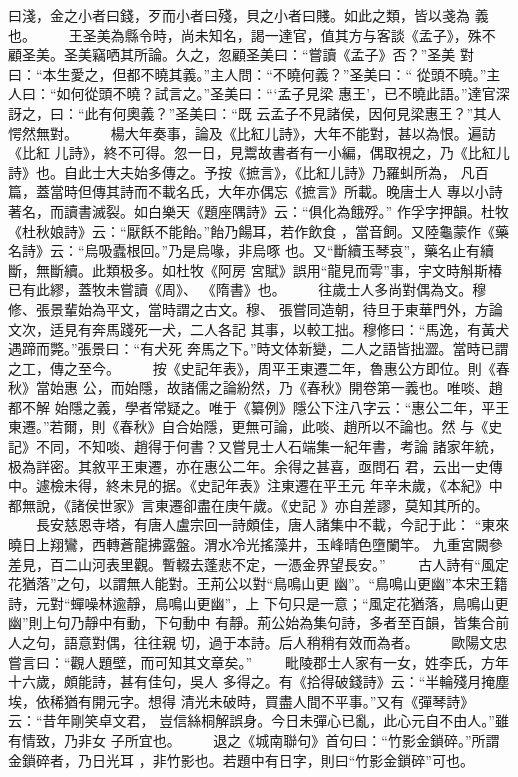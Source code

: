 \documentclass{ctexart}
\begin{document}
曰淺，金之小者曰錢，歹而小者曰殘，貝之小者曰賤。如此之類，皆以戔為 義也。 　　王圣美為縣令時，尚未知名，謁一達官，值其方与客談《孟子》，殊不 顧圣美。圣美竊哂其所論。久之，忽顧圣美曰：``嘗讀《孟子》否？''圣美 對曰：``本生愛之，但都不曉其義。''主人問：``不曉何義？''圣美曰：`` 從頭不曉。''主人曰：``如何從頭不曉？試言之。''圣美曰：```孟子見梁 惠王'，已不曉此語。''達官深訝之，曰：``此有何奧義？''圣美曰：``既 云孟子不見諸侯，因何見梁惠王？''其人愕然無對。 　　楊大年奏事，論及《比紅儿詩》，大年不能對，甚以為恨。遍訪《比紅 儿詩》，終不可得。忽一日，見鬻故書者有一小編，偶取視之，乃《比紅儿 詩》也。自此士大夫始多傳之。予按《摭言》，《比紅儿詩》乃羅虯所為， 凡百篇，蓋當時但傳其詩而不載名氏，大年亦偶忘《摭言》所載。晚唐士人 專以小詩著名，而讀書滅裂。如白樂天《題座隅詩》云：``俱化為餓殍。'' 作孚字押韻。杜牧《杜秋娘詩》云：``厭飫不能飴。''飴乃餳耳，若作飲食 ，當音飼。又陸龜蒙作《藥名詩》云：``烏吸蠹根回。''乃是烏喙，非烏啄 也。又``斷續玉琴哀''，藥名止有續斷，無斷續。此類极多。如杜牧《阿房 宮賦》誤用``龍見而雩''事，宇文時斛斯椿已有此繆，蓋牧未嘗讀《周》、 《隋書》也。 　　往歲士人多尚對偶為文。穆修、張景輩始為平文，當時謂之古文。穆、 張嘗同造朝，待旦于東華門外，方論文次，适見有奔馬踐死一犬，二人各記 其事，以較工拙。穆修曰：``馬逸，有黃犬遇蹄而斃。''張景曰：``有犬死 奔馬之下。''時文体新變，二人之語皆拙澀。當時已謂之工，傳之至今。 　　按《史記年表》，周平王東遷二年，魯惠公方即位。則《春秋》當始惠 公，而始隱，故諸儒之論紛然，乃《春秋》開卷第一義也。唯啖、趙都不解 始隱之義，學者常疑之。唯于《纂例》隱公下注八字云：``惠公二年，平王 東遷。''若爾，則《春秋》自合始隱，更無可論，此啖、趙所以不論也。然 与《史記》不同，不知啖、趙得于何書？又嘗見士人石端集一紀年書，考論 諸家年統，极為詳密。其敘平王東遷，亦在惠公二年。余得之甚喜，亟問石 君，云出一史傳中。遽檢未得，終未見的据。《史記年表》注東遷在平王元 年辛未歲，《本紀》中都無說，《諸侯世家》言東遷卻盡在庚午歲。《史記 》亦自差謬，莫知其所的。 　　長安慈恩寺塔，有唐人盧宗回一詩頗佳，唐人諸集中不載，今記于此： ``東來曉日上翔鸞，西轉蒼龍拂露盤。渭水冷光搖藻井，玉峰晴色墮闌竿。 九重宮闕參差見，百二山河表里觀。暫輟去蓬悲不定，一憑金界望長安。'' 　　古人詩有``風定花猶落''之句，以謂無人能對。王荊公以對``鳥鳴山更 幽''。``鳥鳴山更幽''本宋王籍詩，元對``蟬噪林逾靜，鳥鳴山更幽''，上 下句只是一意；``風定花猶落，鳥鳴山更幽''則上句乃靜中有動，下句動中 有靜。荊公始為集句詩，多者至百韻，皆集合前人之句，語意對偶，往往親 切，過于本詩。后人稍稍有效而為者。 　　歐陽文忠嘗言曰：``觀人題壁，而可知其文章矣。'' 　　毗陵郡士人家有一女，姓李氏，方年十六歲，頗能詩，甚有佳句，吳人 多得之。有《拾得破錢詩》云：``半輪殘月掩塵埃，依稀猶有開元字。想得 清光未破時，買盡人間不平事。''又有《彈琴詩》云：``昔年剛笑卓文君， 豈信絲桐解誤身。今日未彈心已亂，此心元自不由人。''雖有情致，乃非女 子所宜也。 　　退之《城南聯句》首句曰：``竹影金鎖碎。''所謂金鎖碎者，乃日光耳 ，非竹影也。若題中有日字，則曰``竹影金鎖碎''可也。
\clearpage
\end{document}
